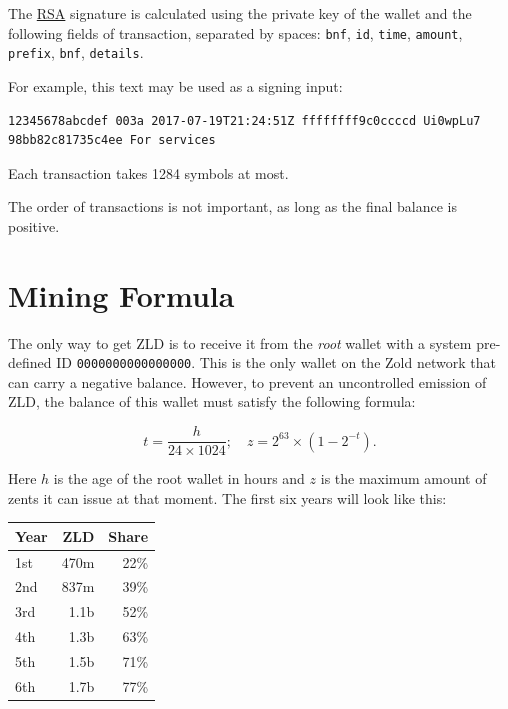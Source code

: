 \documentclass[11pt,oneside]{article}
\newcommand\dd[1]{\colorbox{gray!30}{\texttt{#1}}}
\begin{document}
The \href{https://en.wikipedia.org/wiki/RSA_(cryptosystem)}{RSA}
signature is calculated using the private key of the
wallet and the following fields of transaction, separated by spaces:
\dd{bnf}, \dd{id}, \dd{time}, \dd{amount}, \dd{prefix}, \dd{bnf}, \dd{details}.

For example, this text may be used as a signing input:

\begin{verbatim}
12345678abcdef 003a 2017-07-19T21:24:51Z ffffffff9c0ccccd Ui0wpLu7 98bb82c81735c4ee For services
\end{verbatim}

Each transaction takes 1284 symbols at most.

The order of transactions is not important, as long as the final balance is positive.

\section{Mining Formula}\label{sec:formula}

The only way to get ZLD is to receive it from the \emph{root} wallet
with a system pre-defined ID \dd{0000000000000000}.
This is the only wallet on the Zold network that can carry a negative balance.
However, to prevent an uncontrolled emission of ZLD, the balance
of this wallet must satisfy the following formula:

$$t = \frac{h}{24 \times 1024}; \quad z = 2^{63} \times (1 - 2^{-t}).$$

Here $h$ is the age of the root wallet in hours and $z$ is the maximum
amount of zents it can issue at that moment. The first
six years will look like this:

\vspace{\parskip}\begin{center}\begin{tabular}{lrr}
\hline
Year & ZLD & Share \\
\hline
1st & 470m & 22\% \\
2nd & 837m & 39\% \\
3rd & 1.1b & 52\%\\
4th & 1.3b & 63\% \\
5th & 1.5b & 71\% \\
6th & 1.7b & 77\% \\
\hline
\end{tabular}\end{center}
\end{document}
